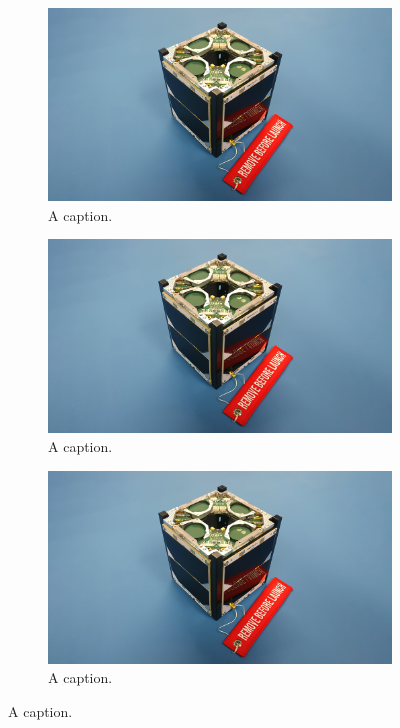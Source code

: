 \begin{figure}[!htb]
	\centering

    \begin{subfigure}[t]{0.3\textwidth}
        \includegraphics[width=\linewidth]{images/istsat1.jpeg}
		\caption{A caption.}
    \end{subfigure}
	\hfill
    \begin{subfigure}[t]{0.3\textwidth}
        \includegraphics[width=\linewidth]{images/istsat1.jpeg}
		\caption{A caption.}
    \end{subfigure}
	\hfill
    \begin{subfigure}[t]{0.3\textwidth}
        \includegraphics[width=\linewidth]{images/istsat1.jpeg}
		\caption{A caption.}
    \end{subfigure}


\end{figure}
